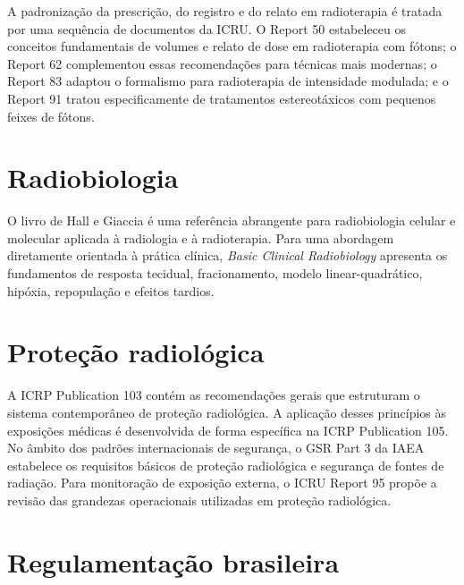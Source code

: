 A padronização da prescrição, do registro e do relato em radioterapia é tratada por uma sequência de documentos da ICRU. O Report 50 estabeleceu os conceitos fundamentais de volumes e relato de dose em radioterapia com fótons\supercite{icru50_1993}; o Report 62 complementou essas recomendações para técnicas mais modernas\supercite{icru62_1999}; o Report 83 adaptou o formalismo para radioterapia de intensidade modulada\supercite{icru83_2010}; e o Report 91 tratou especificamente de tratamentos estereotáxicos com pequenos feixes de fótons\supercite{icru91_2014}.

\section{Radiobiologia}

O livro de Hall e Giaccia é uma referência abrangente para radiobiologia celular e molecular aplicada à radiologia e à radioterapia\supercite{hall2018}. Para uma abordagem diretamente orientada à prática clínica, \emph{Basic Clinical Radiobiology} apresenta os fundamentos de resposta tecidual, fracionamento, modelo linear-quadrático, hipóxia, repopulação e efeitos tardios\supercite{joiner2018}.

\section{Proteção radiológica}

A ICRP Publication 103 contém as recomendações gerais que estruturam o sistema contemporâneo de proteção radiológica\supercite{icrp103_2007}. A aplicação desses princípios às exposições médicas é desenvolvida de forma específica na ICRP Publication 105\supercite{icrp105_2007}. No âmbito dos padrões internacionais de segurança, o GSR Part 3 da IAEA estabelece os requisitos básicos de proteção radiológica e segurança de fontes de radiação\supercite{iaea_gsr3_2014}. Para monitoração de exposição externa, o ICRU Report 95 propõe a revisão das grandezas operacionais utilizadas em proteção radiológica\supercite{icru95_2020}.

\section{Regulamentação brasileira}

